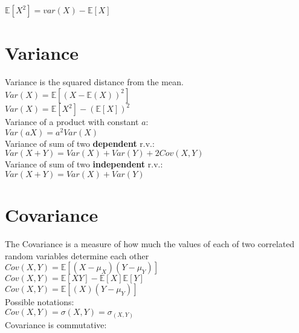 $\mathbb{E}[X^2] = var(X) - \mathbb{E}[X]$\\


\section{Variance}

Variance is the squared distance from the mean.\\

$Var(X)=\mathbb{E}[(X-\mathbb{E}(X))^2]$\\

$Var\left(X\right)=\mathbb{E}\left[X^2\right]-\left(\mathbb{E}\left[X\right]\right)^2$\\

Variance of a product with constant $a$:\\

$Var(aX)=a^2 Var\left(X\right)$\\

Variance of sum of two \textbf{dependent} r.v.:\\

$Var(X + Y)=Var(X)+Var(Y)+2Cov(X,Y)$\\

Variance of sum of two \textbf{independent} r.v.:\\

$Var(X + Y)=Var(X)+Var(Y)$\\

\section{Covariance}

The Covariance is a measure of how much the values of each of two correlated random variables determine each other\\

$Cov(X,Y) = \mathbb E[(X - \mu _ X)(Y - \mu _ Y)]$ \\

$Cov(X,Y) = \mathbb E[XY] - \mathbb E[X]\mathbb E[Y] $\\

$ Cov(X,Y)= \displaystyle  \mathbb E[(X)(Y-\mu _ Y)]$\\

Possible notations:\\

$Cov(X,Y) = \sigma(X,Y) = \sigma_ {(X,Y)}$\\

Covariance is commutative:\\

